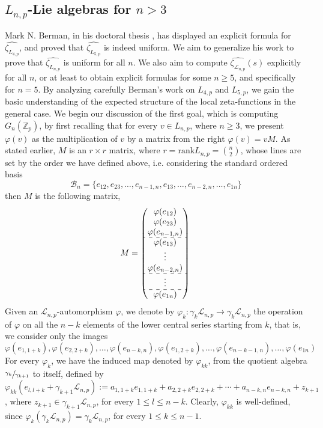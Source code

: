 \documentclass[12pt]{article}
\begin{document}
\subsection{$L_{n,p}$-Lie algebras for $n>3$}
Mark N. Berman, in his doctoral thesis \cite{Berman}, has displayed an explicit formula for $\hat{\zeta_{L_{4,p}}}$, and proved that $\hat{\zeta_{L_{5,p}}}$ is indeed uniform. We aim to generalize his work to prove that $\hat{\zeta_{L_{n,p}}}$ is uniform for all $n$. We also aim to compute $\hat{\zeta_{\mathcal{L}_{n,p}}}(s)$ explicitly for all $n$, or at least to obtain explicit formulas for some $n\geq 5$, and specifically for $n=5$. By analyzing carefully Berman's work on $L_{4,p}$ and $L_{5,p}$, we gain the basic understanding of the expected structure of the local zeta-functions in the general case.
We begin our discussion of the first goal, which is computing $G_n(\mathbb{Z}_p)$, by first recalling that for every $v\in L_{n,p}$, where $n\geq3$, we present $\varphi(v)$ as the multiplication of $v$ by a matrix from the right $\varphi(v)=vM$. As stated earlier, $M$ is an $r\times r$ matrix, where $r=\mathrm{rank}L_{n,p}=\binom{n}{2}$, whose lines are set by the order we have defined above, i.e. considering the standard ordered basis \[\mathcal{B}_n=\{e_{
12},e_{23},\dots,e_{n-1,n},e_{13},\dots,e_{n-2,n},\dots,e_{1n}\}\] then $M$ is the following matrix,
$$
M=\begin{pmatrix}
\varphi(e_{12})\\
\varphi(e_{23})\\
\varphi(e_{n-1,n})\\
\hdashline
\varphi(e_{13})\\
\vdots\\
\varphi(e_{n-2,n})\\
\hdashline
\vdots\\
\hdashline
\varphi(e_{1n})\\
\end{pmatrix}\\
$$
Given an $\mathcal{L}_{n,p}$-automorphism $\varphi$, we denote by $\varphi_k:\gamma_k\mathcal{L}_{n,p}\rightarrow\gamma_k\mathcal{L}_{n,p}$ the operation of $\varphi$ on all the $n-k$ elements of the lower central series starting from $k$, that is, we consider only the images \[\varphi(e_{1,1+k}),\varphi(e_{2,2+k}),\dots,\varphi(e_{n-k,n}),\varphi(e_{1,2+k}),\dots,\varphi(e_{n-k-1,n}),\dots,\varphi(e_{1n})\]
For every $\varphi_k$, we have the induced map denoted by $\varphi_{kk}$, from the quotient algebra $\sfrac{\gamma_k}{\gamma_{k+1}}$ to itself, defined by $\varphi_{kk}(e_{l,l+k}+\gamma_{k+1}\mathcal{L}_{n,p}):=a_{1,1+k}e_{1,1+k}+a_{2,2+k}e_{2,2+k}+\cdots+a_{n-k,n}e_{n-k,n}+z_{k+1}$, where $z_{k+1}\in\gamma_{k+1}\mathcal{L}_{n,p}$, for every $1\leq{l}\leq{n-k}$. Clearly, $\varphi_{kk}$ is well-defined, since $\varphi_k(\gamma_k\mathcal{L}_{n,p})=\gamma_k\mathcal{L}_{n,p}$, for every $1\leq{k}\leq{n-1}$.
\end{document}
